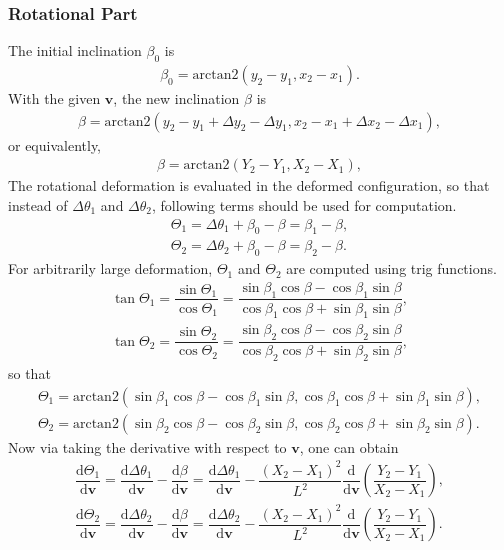 \documentclass[11pt]{article}
\begin{document}
\subsubsection{Rotational Part}
The initial inclination $\beta_0$ is
\begin{gather}
\beta_0=\mathrm{arctan2}\left(y_2-y_1,x_2-x_1\right).
\end{gather}
With the given $\mathbf{v}$, the new inclination $\beta$ is
\begin{gather}
\beta=\mathrm{arctan2}\left(y_2-y_1+\Delta{}y_2-\Delta{}y_1,x_2-x_1+\Delta{}x_2-\Delta{}x_1\right),
\end{gather}
or equivalently,
\begin{gather}
\beta=\mathrm{arctan2}\left(Y_2-Y_1,X_2-X_1\right),
\end{gather}
The rotational deformation is evaluated in the deformed configuration, so that instead of $\Delta{}\theta_1$ and $\Delta{}\theta_2$, following terms should be used for computation.
\begin{gather}
\Theta_1=\Delta{}\theta_1+\beta_0-\beta=\beta_1-\beta,\\
\Theta_2=\Delta{}\theta_2+\beta_0-\beta=\beta_2-\beta.
\end{gather}
For arbitrarily large deformation, $\Theta_1$ and $\Theta_2$ are computed using trig functions.
\begin{gather}
\tan\Theta_1=\dfrac{\sin\Theta_1}{\cos\Theta_1}=\dfrac{\sin\beta_1\cos\beta-\cos\beta_1\sin\beta}{\cos\beta_1\cos\beta+\sin\beta_1\sin\beta},\\
\tan\Theta_2=\dfrac{\sin\Theta_2}{\cos\Theta_2}=\dfrac{\sin\beta_2\cos\beta-\cos\beta_2\sin\beta}{\cos\beta_2\cos\beta+\sin\beta_2\sin\beta},
\end{gather}
so that
\begin{gather}
\Theta_1=\mathrm{arctan2}\left(\sin\beta_1\cos\beta-\cos\beta_1\sin\beta,\cos\beta_1\cos\beta+\sin\beta_1\sin\beta\right),\\
\Theta_2=\mathrm{arctan2}\left(\sin\beta_2\cos\beta-\cos\beta_2\sin\beta,\cos\beta_2\cos\beta+\sin\beta_2\sin\beta\right).
\end{gather}
Now via taking the derivative with respect to $\mathbf{v}$, one can obtain
\begin{gather}
\dfrac{\mathrm{d}\Theta_1}{\mathrm{d}\mathbf{v}}=\dfrac{\mathrm{d}\Delta{}\theta_1}{\mathrm{d}\mathbf{v}}-\dfrac{\mathrm{d}\beta}{\mathrm{d}\mathbf{v}}=
\dfrac{\mathrm{d}\Delta{}\theta_1}{\mathrm{d}\mathbf{v}}-\dfrac{\left(X_2-X_1\right)^2}{L^2}\dfrac{\mathrm{d}}{\mathrm{d}\mathbf{v}}\left(\dfrac{Y_2-Y_1}{X_2-X_1}\right),\\
\dfrac{\mathrm{d}\Theta_2}{\mathrm{d}\mathbf{v}}=\dfrac{\mathrm{d}\Delta{}\theta_2}{\mathrm{d}\mathbf{v}}-\dfrac{\mathrm{d}\beta}{\mathrm{d}\mathbf{v}}=
\dfrac{\mathrm{d}\Delta{}\theta_2}{\mathrm{d}\mathbf{v}}-\dfrac{\left(X_2-X_1\right)^2}{L^2}\dfrac{\mathrm{d}}{\mathrm{d}\mathbf{v}}\left(\dfrac{Y_2-Y_1}{X_2-X_1}\right).
\end{gather}
\end{document}
